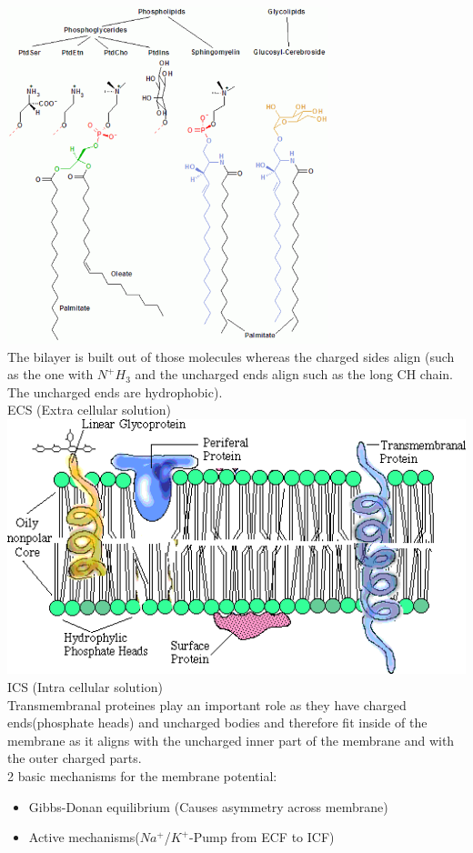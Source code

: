 \documentclass[english,11pt]{article}
\begin{document}
\includegraphics[width=0.7\textwidth]{charged-and-uncharged.png}\\
The bilayer is built out of those molecules whereas the charged sides align (such as the one with $N^{+}H_{3}$ and the uncharged ends align such as the long CH chain. The uncharged ends are hydrophobic).\\

ECS (Extra cellular solution)\\
\includegraphics[width=\textwidth]{bilayer-closeup.png}\\
ICS (Intra cellular solution)\\
Transmembranal proteines play an important role as they have charged ends(phosphate heads) and uncharged bodies and therefore fit inside of the membrane as it aligns with the uncharged inner part of the membrane and with the outer charged parts.\\

2 basic mechanisms for the membrane potential:
\begin{itemize}
\item Gibbs-Donan equilibrium (Causes asymmetry across membrane)
\item Active mechanisms($Na^+$/$K^+$-Pump from ECF to ICF)
\end{itemize}
\end{document}
